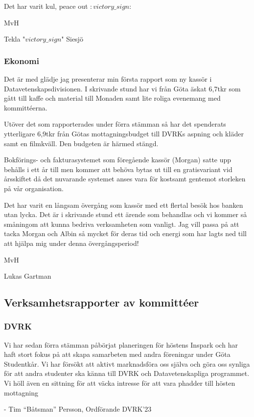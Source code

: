 \documentclass[protokoll]{dvd}
\begin{document}
Det har varit kul, peace out $:victory\_sign:$

MvH

Tekla "$victory\_sign$" Siesjö

\subsubsection*{Ekonomi}
Det är med glädje jag presenterar min första rapport som ny kassör i Datavetenskapsdivisionen.
I skrivande stund har vi från Göta äskat 6,7tkr som gått till kaffe och material till Monaden
samt lite roliga evenemang med kommittéerna.

Utöver det som rapporterades under förra stämman så har det spenderats ytterligare 6,9tkr från
Götas mottagningsbudget till DVRKs aspning och kläder samt en filmkväll. Den budgeten är härmed stängd.

Bokförings- och fakturasystemet som föregående kassör (Morgan) satte upp behålls i ett år till
men kommer att behöva bytas ut till en gratisvariant vid årsskiftet då det nuvarande systemet
anses vara för kostsamt gentemot storleken på vår organisation.

Det har varit en långsam övergång som kassör med ett flertal besök hos banken utan lycka.
Det är i skrivande stund ett ärende som behandlas och vi kommer så småningom att kunna
bedriva verksamheten som vanligt. Jag vill passa på att tacka Morgan och Albin så mycket
för deras tid och energi som har lagts ned till att hjälpa mig under denna övergångsperiod!

MvH

Lukas Gartman

\newpage

\subsection{Verksamhetsrapporter av kommittéer}
\subsubsection*{DVRK}
Vi har sedan förra stämman påbörjat planeringen för höstens Inspark och har haft
stort fokus på att skapa samarbeten med andra föreningar under Göta Studentkår.
Vi har försökt att aktivt marknadsföra oss själva och göra oss synliga för att
andra studenter ska känna till DVRK och Datavetenskapliga programmet.
Vi höll även en sittning för att väcka intresse för att vara phadder
till hösten mottagning

- Tim “Båtsman” Persson, Ordförande DVRK'23
\end{document}
